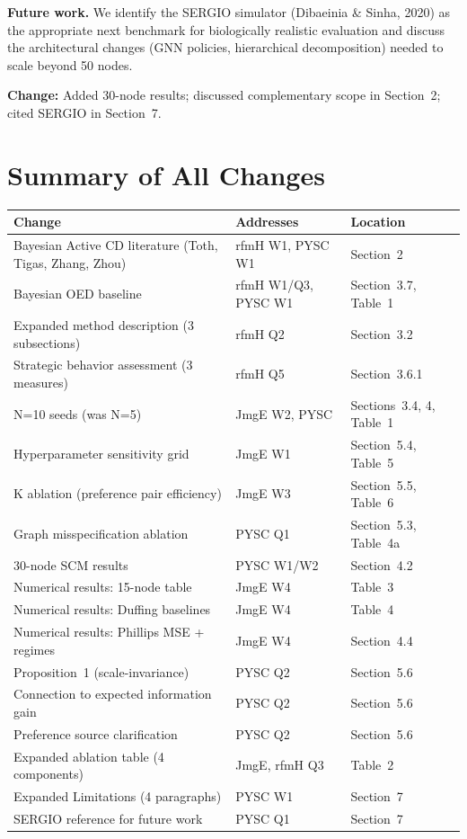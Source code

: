 \documentclass[11pt]{article}
\newcommand{\change}[1]{\textcolor{changecolor}{\textbf{Change:} #1}}
\begin{document}
\textbf{Future work.} We identify the SERGIO simulator (Dibaeinia \& Sinha, 2020) as the appropriate next benchmark for biologically realistic evaluation and discuss the architectural changes (GNN policies, hierarchical decomposition) needed to scale beyond 50 nodes.

\change{Added 30-node results; discussed complementary scope in Section~2; cited SERGIO in Section~7.}

\section{Summary of All Changes}

\begin{table}[h]
\centering
\footnotesize
\begin{tabular}{p{6cm}p{3cm}p{3cm}}
\toprule
\textbf{Change} & \textbf{Addresses} & \textbf{Location} \\
\midrule
Bayesian Active CD literature (Toth, Tigas, Zhang, Zhou) & rfmH W1, PYSC W1 & Section~2 \\
Bayesian OED baseline & rfmH W1/Q3, PYSC W1 & Section~3.7, Table~1 \\
Expanded method description (3 subsections) & rfmH Q2 & Section~3.2 \\
Strategic behavior assessment (3 measures) & rfmH Q5 & Section~3.6.1 \\
N=10 seeds (was N=5) & JmgE W2, PYSC & Sections~3.4, 4, Table~1 \\
Hyperparameter sensitivity grid & JmgE W1 & Section~5.4, Table~5 \\
K ablation (preference pair efficiency) & JmgE W3 & Section~5.5, Table~6 \\
Graph misspecification ablation & PYSC Q1 & Section~5.3, Table~4a \\
30-node SCM results & PYSC W1/W2 & Section~4.2 \\
Numerical results: 15-node table & JmgE W4 & Table~3 \\
Numerical results: Duffing baselines & JmgE W4 & Table~4 \\
Numerical results: Phillips MSE + regimes & JmgE W4 & Section~4.4 \\
Proposition~1 (scale-invariance) & PYSC Q2 & Section~5.6 \\
Connection to expected information gain & PYSC Q2 & Section~5.6 \\
Preference source clarification & PYSC Q2 & Section~5.6 \\
Expanded ablation table (4 components) & JmgE, rfmH Q3 & Table~2 \\
Expanded Limitations (4 paragraphs) & PYSC W1 & Section~7 \\
SERGIO reference for future work & PYSC Q1 & Section~7 \\
\bottomrule
\end{tabular}
\end{table}
\end{document}
